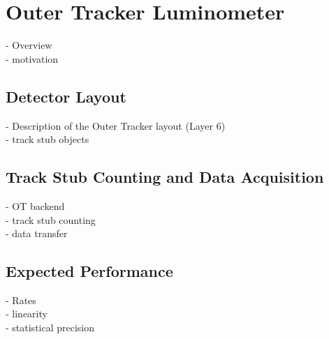 \chapter{Outer Tracker Luminometer}
- Overview \\
- motivation

\section{Detector Layout }
- Description of the Outer Tracker layout (Layer 6)\\
- track stub objects

\section{Track Stub Counting and Data Acquisition}
- OT backend \\ 
- track stub counting \\
- data transfer 

\section{Expected Performance}
- Rates\\
- linearity \\
- statistical precision

\clearpage

